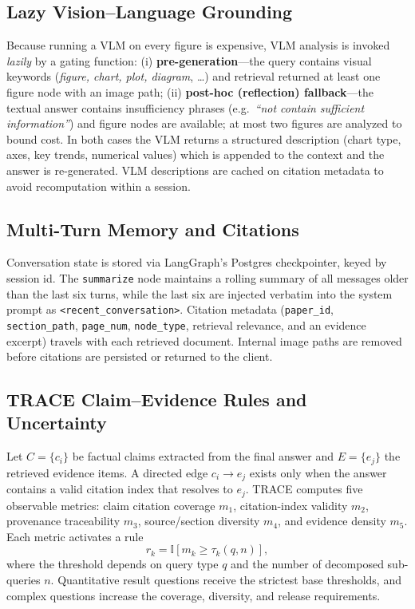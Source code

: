 \documentclass[11pt]{article}
\begin{document}
\subsection{Lazy Vision--Language Grounding}
Because running a VLM on every figure is expensive, VLM analysis is invoked \emph{lazily} by a gating function: (i) \textbf{pre-generation}---the query contains visual keywords (\textit{figure, chart, plot, diagram}, \dots) and retrieval returned at least one figure node with an image path; (ii) \textbf{post-hoc (reflection) fallback}---the textual answer contains insufficiency phrases (e.g.\ \textit{``not contain sufficient information''}) and figure nodes are available; at most two figures are analyzed to bound cost. In both cases the VLM returns a structured description (chart type, axes, key trends, numerical values) which is appended to the context and the answer is re-generated. VLM descriptions are cached on citation metadata to avoid recomputation within a session.

\subsection{Multi-Turn Memory and Citations}
Conversation state is stored via LangGraph's Postgres checkpointer, keyed by session id. The \texttt{summarize} node maintains a rolling summary of all messages older than the last six turns, while the last six are injected verbatim into the system prompt as \texttt{<recent\_conversation>}. Citation metadata (\texttt{paper\_id}, \texttt{section\_path}, \texttt{page\_num}, \texttt{node\_type}, retrieval relevance, and an evidence excerpt) travels with each retrieved document. Internal image paths are removed before citations are persisted or returned to the client.

\subsection{TRACE Claim--Evidence Rules and Uncertainty}
Let $C=\{c_i\}$ be factual claims extracted from the final answer and $E=\{e_j\}$ the retrieved evidence items. A directed edge $c_i\rightarrow e_j$ exists only when the answer contains a valid citation index that resolves to $e_j$. TRACE computes five observable metrics: claim citation coverage $m_1$, citation-index validity $m_2$, provenance traceability $m_3$, source/section diversity $m_4$, and evidence density $m_5$. Each metric activates a rule
\[
r_k=\mathbb{I}\!\left[m_k\ge \tau_k(q,n)\right],
\]
where the threshold depends on query type $q$ and the number of decomposed sub-queries $n$. Quantitative result questions receive the strictest base thresholds, and complex questions increase the coverage, diversity, and release requirements.
\end{document}
